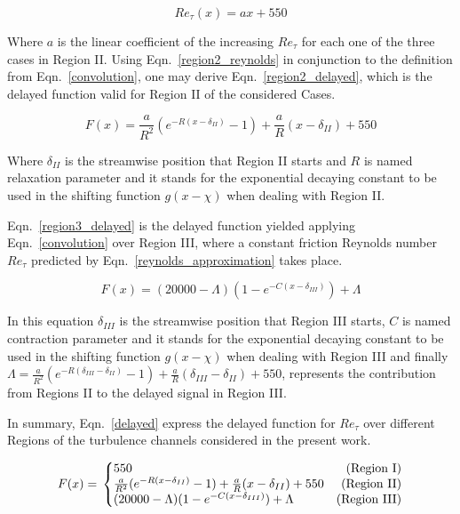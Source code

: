 \documentclass[twocolumn,10pt]{asme2e}
\begin{document}
\begin{equation}
Re_{\tau}(x)=ax+550
\label{region2_reynolds}
\end{equation}

Where \(a\) is the linear coefficient of the increasing \(Re_{\tau}\) for each one of the three cases in Region II. Using Eqn.~\ref{region2_reynolds} in conjunction to the definition from Eqn.~\ref{convolution}, one may derive Eqn.~\ref{region2_delayed}, which is the delayed function valid for Region II of the considered Cases.

\begin{equation}
F(x)= \frac{a}{R^2}(e^{-R(x-{\delta}_{II})}-1)+\frac{a}{R}(x-{\delta}_{II})+550
\label{region2_delayed}
\end{equation}

Where \({\delta}_{II}\) is the streamwise position that Region II starts and \(R\) is named relaxation parameter and it stands for the exponential decaying constant to be used in the shifting function \(g(x-\chi)\) when dealing with Region II.

Eqn.~\ref{region3_delayed} is the delayed function yielded applying Eqn.~\ref{convolution} over Region III, where a constant friction Reynolds number \(Re_{\tau}\) predicted by Eqn.~\ref{reynolds_approximation} takes place.

\begin{equation}
F(x)= (20000-{\Lambda})(1-e^{-C(x-{\delta}_{III})})+{\Lambda}
\label{region3_delayed}
\end{equation}

In this equation \({\delta}_{III}\) is the streamwise position that Region III starts, \(C\) is named contraction parameter and it stands for the exponential decaying constant to be used in the shifting function \(g(x-\chi)\) when dealing with Region III and finally
 \({\Lambda}=\frac{a}{R^2}(e^{-R({\delta}_{III}-{\delta}_{II})}-1)+\frac{a}{R}({\delta}_{III}-{\delta}_{II})+550\), represents the contribution from Regions II to the delayed signal in Region III.

In summary, Eqn.~\ref{delayed} express the delayed function for \(Re_{\tau}\) over different Regions of the turbulence channels considered in the present work.

\begin{equation} \label{delayed}
F(x) = \\
    \left\{\begin{array}{@{}lr@{}}
        550  & \text{(Region I)}\\
        \frac{a}{R^2}(e^{-R(x-{\delta}_{II})}-1)+\frac{a}{R}(x-{\delta}_{II})+550 & \text{(Region II)}\\
        (20000-{\Lambda})(1-e^{-C(x-{\delta}_{III})})+{\Lambda} &  \text{(Region III)}
\end{array}\right.
\end{equation}
\end{document}
